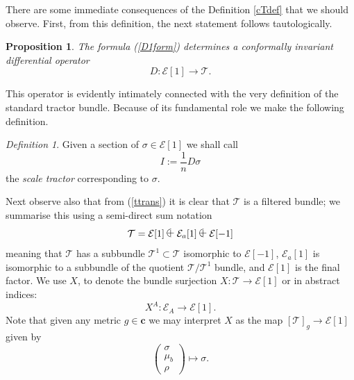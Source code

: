\documentclass[a4paper,12pt]{amsart}
\def\Cal{\mathcal}
\newcommand{\cc}{\boldsymbol{c}}
\newcommand{\ce}{{\Cal E}}
\newcommand{\cT}{{\mathcal T}}
\newcommand{\si}{\sigma}
\newcommand{\lpl}{
  \mbox{$
  \begin{picture}(12.7,8)(-.5,-1)
  \put(2,0.2){$+$}
  \put(6.2,2.8){\oval(8,8)[l]}
  \end{picture}$}}
\newtheorem{proposition}[theorem]{Proposition}
\theoremstyle{remark}
\newcommand{\nn}[1]{(\ref{#1})}
\newtheorem{definition}{Definition}
\begin{document}
There are some immediate consequences of the Definition \ref{cTdef}
that we should observe. First, from this definition, the next statement
follows tautologically.
\begin{proposition}\label{D1}
The formula \nn{D1form} determines a conformally invariant
differential operator
$$
D:\ce[1]\to \cT.
$$
\end{proposition}
This operator is evidently intimately connected with the very
definition of the standard tractor bundle. Because of its fundamental role we
make the following definition.   
\begin{definition}\label{scaletractor}
Given a section of $\sigma\in \ce[1]$ we shall call 
$$
I:= \frac{1}{n}D \sigma
$$
the {\em scale tractor} corresponding to $\si$. 
\end{definition} 

Next observe also that from \nn{ttrans} it is clear that $\cT$ is a
filtered bundle; we summarise this using a semi-direct sum notation
\begin{equation}\label{Tcomp}
\cT= \ce[1]\lpl \ce_a[1]\lpl \ce[-1]
\end{equation}
meaning that $\cT$ has a subbundle $\cT^1\subset \cT$ isomorphic to
$\ce[-1]$, $\ce_a[1]$ is isomorphic to a subbundle of the quotient
$\cT/\cT^1$ bundle, and $\ce[1]$ is the final factor. 
We use $X$, to denote the bundle surjection $X: \cT \to \ce[1]$
or in abstract indices:
\begin{equation}\label{cant}
X^A :\ce_A\to \ce[1].
\end{equation}
Note that given any metric $g\in \cc$ we may interpret $X$ as the map $[\cT]_g \to \ce[1]$ given by
$$
\left(\begin{array}{c}
\si\\
\mu_b\\
\rho
\end{array}\right) \mapsto \si.
$$
\end{document}

